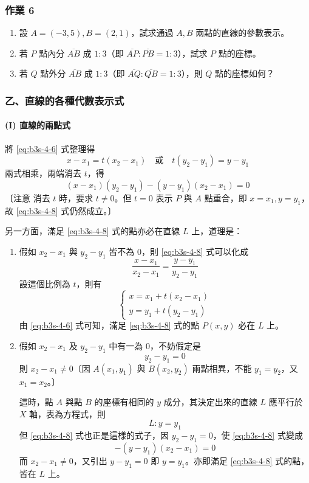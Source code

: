 \subsubsection*{作業 6}
\begin{enumerate}[label=(\roman*), leftmargin=2em]
  \item 設 $A = (-3, 5), B = (2, 1)$，試求通過 $A, B$ 兩點的直線的參數表示。
  \item 若 $P$ 點內分 $\overline{AB}$ 成 $1 : 3$（即 $\overline{AP} : \overline{PB} = 1 : 3$），試求 $P$ 點的座標。
  \item 若 $Q$ 點外分 $\overline{AB}$ 成 $1 : 3$（即 $\overline{AQ} : \overline{QB} = 1 : 3$），則 $Q$ 點的座標如何？
\end{enumerate}

\subsubsection*{乙、直線的各種代數表示式}

\paragraph*{(I) 直線的兩點式}
將 \eqref{eq:b3s-4-6} 式整理得
\[ x - x_1 = t(x_2 - x_1) \quad\text{或}\quad t(y_2 - y_1) = y - y_1 \]
兩式相乘，兩端消去 $t$，得
\begin{equation}
(x - x_1)(y_2 - y_1) - (y - y_1)(x_2 - x_1) = 0
\label{eq:b3s-4-8}
\end{equation}
〔注意 消去 $t$ 時，要求 $t \neq 0$。但 $t = 0$ 表示 $P$ 與 $A$ 點重合，即 $x = x_1, y = y_1$，故 \eqref{eq:b3s-4-8} 式仍然成立。〕

另一方面，滿足 \eqref{eq:b3s-4-8} 式的點亦必在直線 $L$ 上，道理是：
\begin{enumerate}[label=(\alph*), leftmargin=2em]
  \item 假如 $x_2 - x_1$ 與 $y_2 - y_1$ 皆不為 0，則 \eqref{eq:b3s-4-8} 式可以化成
  \[ \frac{x - x_1}{x_2 - x_1} = \frac{y - y_1}{y_2 - y_1} \]
  設這個比例為 $t$，則有
  \[ \begin{cases} x = x_1 + t(x_2 - x_1) \\ y = y_1 + t(y_2 - y_1) \end{cases} \]
  由 \eqref{eq:b3s-4-6} 式可知，滿足 \eqref{eq:b3s-4-8} 式的點 $P(x, y)$ 必在 $L$ 上。
  
  \item 假如 $x_2 - x_1$ 及 $y_2 - y_1$ 中有一為 0，不妨假定是
  \[ y_2 - y_1 = 0 \]
  則 $x_2 - x_1 \neq 0$〔因 $A(x_1, y_1)$ 與 $B(x_2, y_2)$ 兩點相異，不能 $y_1 = y_2$，又 $x_1 = x_2$。〕
  
  這時，點 $A$ 與點 $B$ 的座標有相同的 $y$ 成分，其決定出來的直線 $L$ 應平行於 $X$ 軸，表為方程式，則
  \[ L : y = y_1 \]
  但 \eqref{eq:b3s-4-8} 式也正是這樣的式子，因 $y_2 - y_1 = 0$，使 \eqref{eq:b3s-4-8} 式變成
  \[ -(y - y_1)(x_2 - x_1) = 0 \]
  而 $x_2 - x_1 \neq 0$，又引出 $y - y_1 = 0$ 即 $y = y_1$。亦即滿足 \eqref{eq:b3s-4-8} 式的點，皆在 $L$ 上。
\end{enumerate}

